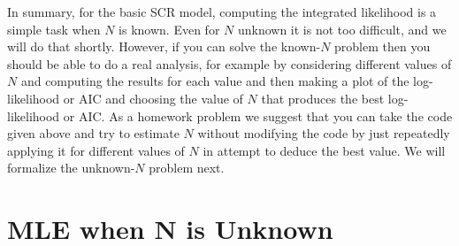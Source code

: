 \begin{comment} 
To compute the integrated likelihood we used a discrete representation
of the state-space so that the integral could be approximated as a
summation over possible values of ${\bf s}$ with each value being
weighted by its probability of occurring, which is $1/nG$ under the
assumption that ${\bf s}$ is uniform on the state-space ${\cal
  S}$. Recall
in Chapt. \ref{chapt.scr0} we 
used a discrete state-space in developing a Bayesian analysis of the
model in order to be able to modify the state-space in a flexible
manner. In that case, we could use the discretized state-space as the
integration grid and just feed it into our integrated likelihood
routine. 
\end{comment}

In summary, for the basic SCR model, computing the integrated
likelihood is a simple task when $N$ is known. Even for $N$
unknown it is not too difficult, and we will do that shortly.
However, if you can solve the known-$N$ problem then you should be able
to do a real analysis, for example by considering different values of
$N$ and computing the results for each value and then making a plot of
the log-likelihood or AIC and choosing the value of $N$ that produces
the best log-likelihood or AIC. As a homework problem we suggest that
you can take the code given above and try to estimate $N$ without
modifying the code by just repeatedly applying it for 
different values of $N$ in attempt to deduce the best value.
We will formalize the unknown-$N$ problem next.



\section{MLE when N is Unknown} 
\label{mle.sec.Nunknown}

